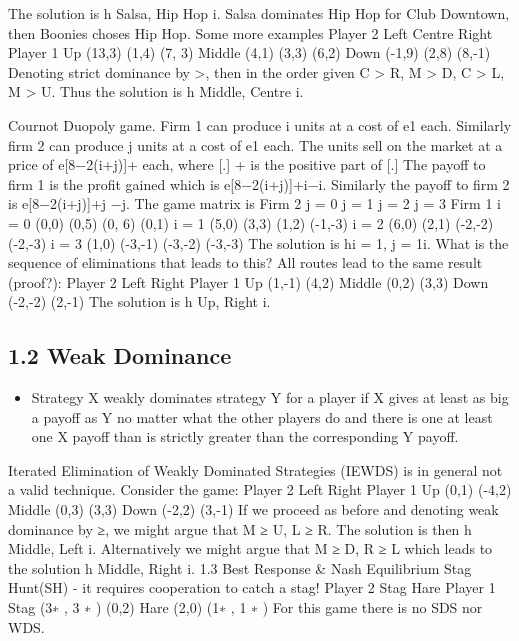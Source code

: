 The solution is h Salsa, Hip Hop i. Salsa dominates Hip Hop for Club Downtown, then
Boonies choses Hip Hop.
Some more examples
Player 2
Left Centre Right
Player 1
Up (13,3) (1,4) (7, 3)
Middle (4,1) (3,3) (6,2)
Down (-1,9) (2,8) (8,-1)
Denoting strict dominance by >, then in the order given C > R, M > D, C > L, M > U.
Thus the solution is h Middle, Centre i.

Cournot Duopoly game. Firm 1 can produce i units at a cost of e1 each. Similarly firm
2 can produce j units at a cost of e1 each. The units sell on the market at a price of
e[8−2(i+j)]+ each, where [.]
+ is the positive part of [.] The payoff to firm 1 is the profit
gained which is e[8−2(i+j)]+i−i. Similarly the payoff to firm 2 is e[8−2(i+j)]+j −j.
The game matrix is
Firm 2
j = 0 j = 1 j = 2 j = 3
Firm 1
i = 0 (0,0) (0,5) (0, 6) (0,1)
i = 1 (5,0) (3,3) (1,2) (-1,-3)
i = 2 (6,0) (2,1) (-2,-2) (-2,-3)
i = 3 (1,0) (-3,-1) (-3,-2) (-3,-3)
The solution is hi = 1, j = 1i. What is the sequence of eliminations that leads to this?
All routes lead to the same result (proof?):
Player 2
Left Right
Player 1
Up (1,-1) (4,2)
Middle (0,2) (3,3)
Down (-2,-2) (2,-1)
The solution is h Up, Right i.
\subsection{1.2 Weak Dominance}
\begin{itemize}
\item Strategy X weakly dominates strategy Y for a player if X gives at least as big a payoff as Y
no matter what the other players do and there is one at least one X payoff than is strictly
greater than the corresponding Y payoff.
\end{itemize}
Iterated Elimination of Weakly Dominated Strategies (IEWDS) is in general not
a valid technique. Consider the game:
Player 2
Left Right
Player 1
Up (0,1) (-4,2)
Middle (0,3) (3,3)
Down (-2,2) (3,-1)
If we proceed as before and denoting weak dominance by ≥, we might argue that M ≥
U, L ≥ R. The solution is then h Middle, Left i. Alternatively we might argue that M ≥
D, R ≥ L which leads to the solution h Middle, Right i.
1.3 Best Response & Nash Equilibrium
Stag Hunt(SH) - it requires cooperation to catch a stag!
Player 2
Stag Hare
Player 1 Stag (3∗
, 3
∗
) (0,2)
Hare (2,0) (1∗
, 1
∗
)
For this game there is no SDS nor WDS.

